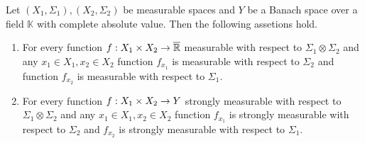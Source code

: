 \begin{proposition}\label{proposition:sectionsoftensorsigmaalgebra}
Let $(X_1,\Sigma_1), (X_2,\Sigma_2)$ be measurable spaces and $Y$ be a Banach space over a field $\mathbb{K}$ with complete absolute value. Then the following assetions hold.
\begin{enumerate}[label=\emph{\textbf{(\arabic*)}}, leftmargin=*]
\item For every function $f:X_1\times X_2\rightarrow \overline{{\mathbb R}}$ measurable with respect to $\Sigma_1\otimes \Sigma_2$ and any $x_1\in X_1,x_2\in X_2$ function $f_{x_1}$ is measurable with respect to $\Sigma_2$ and function $f_{x_2}$ is measurable with respect to $\Sigma_1$.
\item For every function $f:X_1\times X_2\rightarrow Y$ strongly measurable with respect to $\Sigma_1\otimes \Sigma_2$ and any $x_1\in X_1,x_2\in X_2$ function $f_{x_1}$ is strongly measurable with respect to $\Sigma_2$ and $f_{x_2}$ is strongly measurable with respect to $\Sigma_1$.
\end{enumerate}
\end{proposition}
